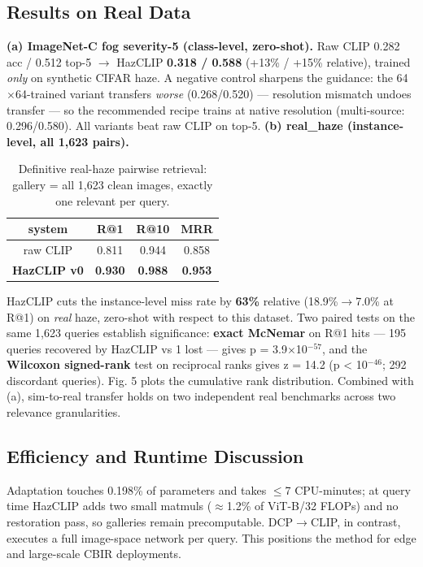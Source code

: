 \documentclass[journal]{IEEEtran}
\begin{document}
\subsection{Results on Real Data}
\textbf{(a) ImageNet-C fog severity-5 (class-level, zero-shot).} Raw CLIP
0.282 acc / 0.512 top-5 $\rightarrow$ HazCLIP \textbf{0.318 / 0.588} (+13\% / +15\%
relative), trained \emph{only} on synthetic CIFAR haze. A negative control
sharpens the guidance: the 64$\times$64-trained variant transfers \emph{worse}
(0.268/0.520) --- resolution mismatch undoes transfer --- so the recommended
recipe trains at native resolution (multi-source: 0.296/0.580). All
variants beat raw CLIP on top-5.
\textbf{(b) real\_haze (instance-level, all 1,623 pairs).}
\begin{table}[!t]
\caption{Definitive real-haze pairwise retrieval: gallery = all 1,623 clean images, exactly one relevant per query.}
\label{tab:definitiverealhaze}
\centering\footnotesize\setlength{\tabcolsep}{4pt}
\begin{tabular}{@{}cccc@{}}\toprule
\textbf{system} & \textbf{R@1} & \textbf{R@10} & \textbf{MRR} \\
\midrule
raw CLIP & 0.811 & 0.944 & 0.858 \\
\textbf{HazCLIP v0} & \textbf{0.930} & \textbf{0.988} & \textbf{0.953} \\
\bottomrule\end{tabular}
\end{table}
HazCLIP cuts the instance-level miss rate by \textbf{63\%} relative
(18.9\%$\rightarrow$7.0\% at R@1) on \emph{real} haze, zero-shot with respect to this
dataset. Two paired tests on the same 1,623 queries establish
significance: \textbf{exact McNemar} on R@1 hits --- 195 queries recovered by
HazCLIP vs 1 lost --- gives p = 3.9$\times$10$^{-57}$, and the \textbf{Wilcoxon signed-rank}
test on reciprocal ranks gives z = 14.2 (p < 10$^{-46}$; 292 discordant
queries). Fig. 5 plots the cumulative rank distribution. Combined with
(a), sim-to-real transfer holds on two independent real benchmarks across
two relevance granularities.
\subsection{Efficiency and Runtime Discussion}
Adaptation touches 0.198\% of parameters and takes $\leq$7 CPU-minutes; at query
time HazCLIP adds two small matmuls ($\approx$1.2\% of ViT-B/32 FLOPs) and no
restoration pass, so galleries remain precomputable. DCP$\rightarrow$CLIP, in
contrast, executes a full image-space network per query. This positions
the method for edge and large-scale CBIR deployments.
\end{document}
